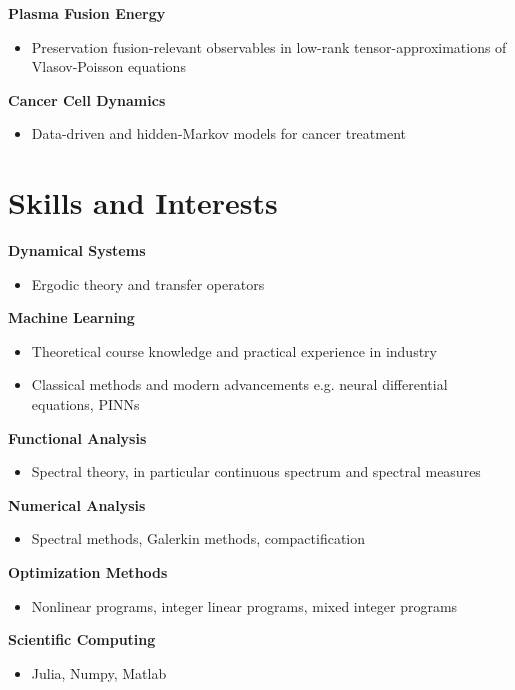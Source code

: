\documentclass[10pt,a4paper]{article}
\begin{document}
\medskip
\textbf{Plasma Fusion Energy}
\begin{itemize}
    \item Preservation fusion-relevant observables in low-rank tensor-approximations of Vlasov-Poisson equations
\end{itemize}

\medskip
\textbf{Cancer Cell Dynamics}
\begin{itemize}
    \item Data-driven and hidden-Markov models for cancer treatment
\end{itemize}

\newpage
\section{Skills and Interests}

\textbf{Dynamical Systems}
\begin{itemize}
    \item Ergodic theory and transfer operators
\end{itemize}

\smallskip
\textbf{Machine Learning}
\begin{itemize}
    \item Theoretical course knowledge and practical experience in industry
    \item Classical methods and modern advancements e.g. neural differential equations, PINNs
\end{itemize}

\smallskip
\textbf{Functional Analysis}
\begin{itemize}
    \item Spectral theory, in particular continuous spectrum and spectral measures
\end{itemize}

\smallskip
\textbf{Numerical Analysis}
\begin{itemize}
    \item Spectral methods, Galerkin methods, compactification
\end{itemize}

\smallskip
\textbf{Optimization Methods}
\begin{itemize}
    \item Nonlinear programs, integer linear programs, mixed integer programs
\end{itemize}

\smallskip
\textbf{Scientific Computing}
\begin{itemize}
    \item Julia, Numpy, Matlab
\end{itemize}
\fi
\end{document}
